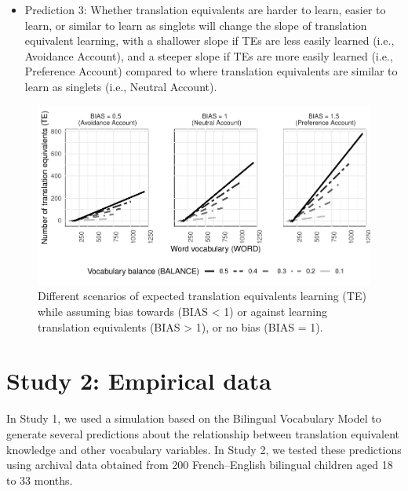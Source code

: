 \documentclass[
  english,
  ,man,floatsintext]{apa6}
\providecommand{\tightlist}{%
  \setlength{\itemsep}{0pt}\setlength{\parskip}{0pt}}
\begin{document}
\begin{itemize}
\tightlist
\item
  Prediction 3: Whether translation equivalents are harder to learn, easier to learn, or similar to learn as singlets will change the slope of translation equivalent learning, with a shallower slope if TEs are less easily learned (i.e., Avoidance Account), and a steeper slope if TEs are more easily learned (i.e., Preference Account) compared to where translation equivalents are similar to learn as singlets (i.e., Neutral Account).
\end{itemize}

\begin{figure}

{\centering \includegraphics[width=1\linewidth,height=0.8\textheight]{paper_TE_bilingual_vocabulary_model_files/figure-latex/fig4-1} 

}

\caption{Different scenarios of expected translation equivalents learning (TE) while assuming bias towards (BIAS < 1) or against learning translation equivalents (BIAS > 1), or no bias (BIAS = 1).}\label{fig:fig4}
\end{figure}

\hypertarget{study-2-empirical-data}{%
\section{Study 2: Empirical data}\label{study-2-empirical-data}}

In Study 1, we used a simulation based on the Bilingual Vocabulary Model to generate several predictions about the relationship between translation equivalent knowledge and other vocabulary variables. In Study 2, we tested these predictions using archival data obtained from 200 French--English bilingual children aged 18 to 33 months.
\end{document}

